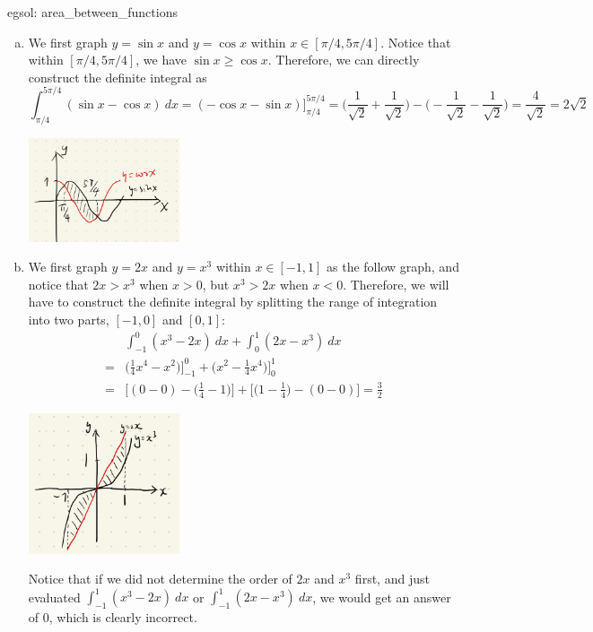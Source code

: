 \begin{egsol}[]{egsol: area_between_functions}
\begin{enumerate}[a)]
\begin{center}
        \end{center}
        \item We first graph $y = \sin x$ and $y = \cos x$ within $x \in [\pi/4, 5\pi/4]$.  Notice that within $[\pi/4, 5\pi/4]$, we have $\sin x \ge \cos x$.  Therefore, we can directly construct the definite integral as
        \[\int_{\pi/4}^{5\pi/4} (\sin x - \cos x)~dx = (- \cos x - \sin x) \Big]_{\pi/4}^{5\pi/4} = \Big(\frac{1}{\sqrt{2}} + \frac{1}{\sqrt{2}}\Big)-\Big(-\frac{1}{\sqrt{2}} - \frac{1}{\sqrt{2}}\Big) = \frac{4}{\sqrt{2}} = 2\sqrt{2}\]
        \begin{center}
            \includegraphics[width = 0.35\textwidth]{figures/chap 07/eg_7_3_c.png}
        \end{center}
        \item We first graph $y = 2x$ and $y = x^3$ within $x \in [-1, 1]$ as the follow graph, and notice that $2x > x^3$ when $x > 0$, but $x^3 > 2x$ when $x < 0$.  Therefore, we will have to construct the definite integral by splitting the range of integration into two parts, $[-1, 0]$ and $[0,1]$:
        \begin{align*}
            &\int_{-1}^0 (x^3-2x)~dx + \int_0^1 (2x-x^3)~dx\\
            =& \Big(\frac{1}{4}x^4 - x^2\Big)\Big]_{-1}^0 + \Big(x^2 - \frac{1}{4}x^4\Big)\Big]_0^1\\
            =& \Big[(0 - 0) - \Big(\frac{1}{4}-1\Big)\Big] + \Big[\Big(1 - \frac{1}{4}\Big)-(0-0)\Big] = \frac{3}{2}
        \end{align*}
        \begin{center}
            \includegraphics[width = 0.35\textwidth]{figures/chap 07/eg_7_3_d.png}
        \end{center}
        Notice that if we did not determine the order of $2x$ and $x^3$ first, and just evaluated $\int_{-1}^1 (x^3-2x)~dx$ or $\int_{-1}^1 (2x - x^3)~dx$, we would get an answer of $0$, which is clearly incorrect.
    \end{enumerate}
\end{egsol}

